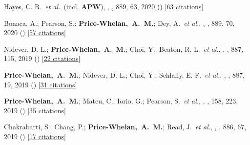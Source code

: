 {\item[{\color{deemph}\scriptsize70}]Hayes, C. R.~\textit{et al.}~(incl. \textbf{APW}), , \apj, 889, 63, 2020 () [\href{http://adsabs.harvard.edu/abs/2020ApJ...889...63H}{63 citations}]

\item[{\color{deemph}\scriptsize69}]Bonaca, A.; Pearson, S.; \textbf{Price-Whelan,~A.~M.}; Dey, A.~\textit{et al.}, , \apj, 889, 70, 2020 () [\href{http://adsabs.harvard.edu/abs/2020ApJ...889...70B}{57 citations}]

\item[{\color{deemph}\scriptsize68}]Nidever, D. L.; \textbf{Price-Whelan,~A.~M.}; Choi, Y.; Beaton, R. L.~\textit{et al.}, , \apj, 887, 115, 2019 () [\href{http://adsabs.harvard.edu/abs/2019ApJ...887..115N}{22 citations}]

\item[{\color{deemph}\scriptsize67}]\textbf{Price-Whelan,~A.~M.}; Nidever, D. L.; Choi, Y.; Schlafly, E. F.~\textit{et al.}, , \apj, 887, 19, 2019 () [\href{http://adsabs.harvard.edu/abs/2019ApJ...887...19P}{31 citations}]

\item[{\color{deemph}\scriptsize66}]\textbf{Price-Whelan,~A.~M.}; Mateu, C.; Iorio, G.; Pearson, S.~\textit{et al.}, , \aj, 158, 223, 2019 () [\href{http://adsabs.harvard.edu/abs/2019AJ....158..223P}{35 citations}]

\item[{\color{deemph}\scriptsize65}]Chakrabarti, S.; Chang, P.; \textbf{Price-Whelan,~A.~M.}; Read, J.~\textit{et al.}, , \apj, 886, 67, 2019 () [\href{http://adsabs.harvard.edu/abs/2019ApJ...886...67C}{17 citations}]

}
